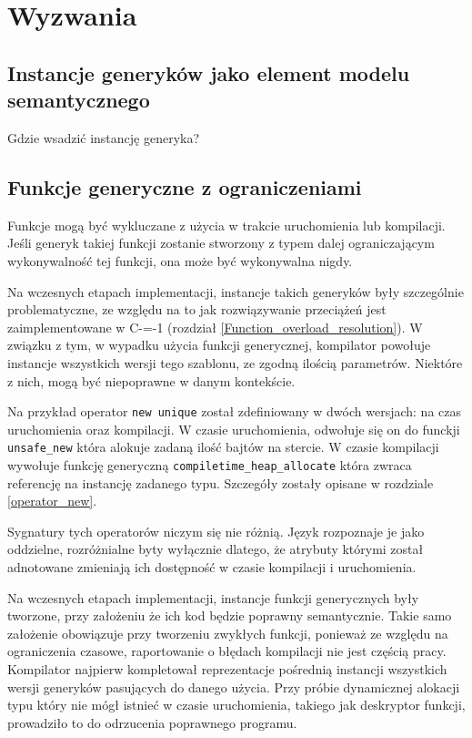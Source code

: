\section{Wyzwania}
\subsection{Instancje generyków jako element modelu semantycznego}
Gdzie wsadzić instancję generyka?

\subsection{Funkcje generyczne z ograniczeniami}

Funkcje mogą być wykluczane z użycia w trakcie uruchomienia lub kompilacji. Jeśli generyk takiej funkcji zostanie stworzony z typem dalej ograniczającym wykonywalność tej funkcji, ona może być wykonywalna nigdy.

Na wczesnych etapach implementacji, instancje takich generyków były szczególnie problematyczne, ze względu na to jak rozwiązywanie przeciążeń jest zaimplementowane w C-=-1 (rozdział \ref{Function_overload_resolution}).
W związku z tym, w wypadku użycia funkcji generycznej, kompilator powołuje instancje wszystkich wersji tego szablonu, ze zgodną ilością parametrów.
Niektóre z nich, mogą być niepoprawne w danym kontekście. 

Na przykład operator \lstinline{new unique} został zdefiniowany w dwóch wersjach: na czas uruchomienia oraz kompilacji.
W czasie uruchomienia, odwołuje się on do funckji \lstinline{unsafe_new} która alokuje zadaną ilość bajtów na stercie.
W czasie kompilacji wywołuje funkcję generyczną \lstinline{compiletime_heap_allocate} która zwraca referencję na instancję zadanego typu.
Szczegóły zostały opisane w rozdziale \ref{operator_new}.

Sygnatury tych operatorów niczym się nie różnią.
Język rozpoznaje je jako oddzielne, rozróżnialne byty wyłącznie dlatego, że atrybuty którymi został adnotowane zmieniają ich dostępność w czasie kompilacji i uruchomienia.

Na wczesnych etapach implementacji, instancje funkcji generycznych były tworzone, przy założeniu że ich kod będzie poprawny semantycznie.
Takie samo założenie obowiązuje przy tworzeniu zwykłych funkcji, ponieważ ze względu na ograniczenia czasowe, raportowanie o błędach kompilacji nie jest częścią pracy.
Kompilator najpierw kompletował reprezentacje pośrednią instancji wszystkich wersji generyków pasujących do danego użycia.
Przy próbie dynamicznej alokacji typu który nie mógł istnieć w czasie uruchomienia, takiego jak deskryptor funkcji, prowadziło to do odrzucenia poprawnego programu.
